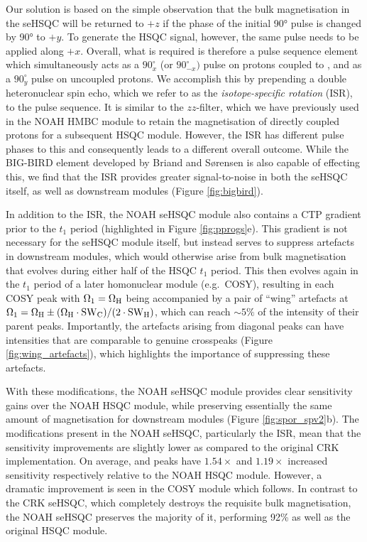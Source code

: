 \documentclass[11pt]{article}
\newcommand*{\carbon}{\ce{^{13}C}}
\newcommand*{\proton}{\ce{^{1}H}}
\newcommand*{\figref}[1]{Figure \ref{fig:#1}}
\begin{document}
Our solution is based on the simple observation that the bulk magnetisation in the seHSQC will be returned to $+z$ if the phase of the initial \proton{} \ang{90} pulse is changed by \ang{90} to $+y$.
To generate the HSQC signal, however, the same pulse needs to be applied along $+x$.
Overall, what is required is therefore a pulse sequence element which simultaneously acts as a $90^\circ_x$ (or $90^\circ_{-x})$ pulse on protons coupled to \carbon{}, and as a $90^\circ_y$ pulse on uncoupled protons.
We accomplish this by prepending a double heteronuclear spin echo, which we refer to as the \textit{isotope-specific rotation} (ISR), to the pulse sequence.
It is similar to the $zz$-filter, which we have previously used in the NOAH HMBC module to retain the magnetisation of directly coupled protons for a subsequent HSQC module.\autocite{Kupce2018CC, Kupce2019JMR}
However, the ISR has different pulse phases to this and consequently leads to a different overall outcome.
While the BIG-BIRD element developed by Briand and S{\o}rensen\autocite{Briand1997JMR} is also capable of effecting this, we find that the ISR provides greater signal-to-noise in both the seHSQC itself, as well as downstream modules (\figref{bigbird}).

In addition to the ISR, the NOAH seHSQC module also contains a CTP gradient prior to the $t_1$ period (highlighted in \figref{pprogs}e).
This gradient is not necessary for the seHSQC module itself, but instead serves to suppress artefacts in downstream modules, which would otherwise arise from bulk magnetisation that evolves during either half of the HSQC $t_1$ period.
This then evolves again in the $t_1$ period of a later homonuclear module (e.g.\ COSY), resulting in each COSY peak with $\Omega_1 = \Omega_{\ce{H}}$ being accompanied by a pair of ``wing'' artefacts at $\Omega_1 = \Omega_{\ce{H}} \pm (\Omega_{\ce{H}}\cdot\mathrm{SW}_{\ce{C}})/(2\cdot \mathrm{SW}_{\ce{H}})$, which can reach $\sim 5\%$ of the intensity of their parent peaks.
Importantly, the artefacts arising from diagonal peaks can have intensities that are comparable to genuine crosspeaks (\figref{wing_artefacts}), which highlights the importance of suppressing these artefacts.

With these modifications, the NOAH seHSQC module provides clear sensitivity gains over the NOAH HSQC module, while preserving essentially the same amount of \proton{} magnetisation for downstream modules (\figref{spor_spv2}b).
The modifications present in the NOAH seHSQC, particularly the ISR, mean that the sensitivity improvements are slightly lower as compared to the original CRK implementation.
On average,  and  peaks have $1.54\times$ and $1.19\times$ increased sensitivity respectively relative to the NOAH HSQC module.
However, a dramatic improvement is seen in the COSY module which follows.
In contrast to the CRK seHSQC, which completely destroys the requisite bulk magnetisation, the NOAH seHSQC preserves the majority of it, performing 92\% as well as the original HSQC module.
\end{document}
